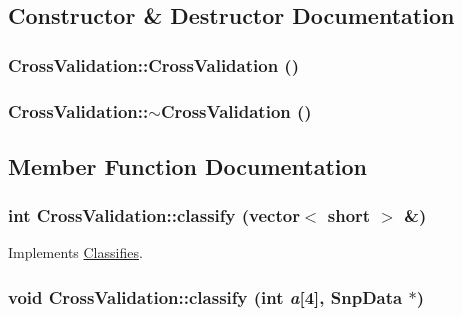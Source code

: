 \subsection{Constructor \& Destructor Documentation}
\hypertarget{classCrossValidation_a855f538ef5541634f1dd94fbf965129b}{
\subsubsection[{CrossValidation}]{\setlength{\rightskip}{0pt plus 5cm}CrossValidation::CrossValidation ()}}
\label{classCrossValidation_a855f538ef5541634f1dd94fbf965129b}
\hypertarget{classCrossValidation_a1e65ae700add864f2f85dcdf82940d74}{
\subsubsection[{$\sim$CrossValidation}]{\setlength{\rightskip}{0pt plus 5cm}CrossValidation::$\sim$CrossValidation ()}}
\label{classCrossValidation_a1e65ae700add864f2f85dcdf82940d74}


\subsection{Member Function Documentation}
\hypertarget{classCrossValidation_a4c11570314fe9e98e434abee990ac2d4}{
\subsubsection[{classify}]{\setlength{\rightskip}{0pt plus 5cm}int CrossValidation::classify (vector$<$ short $>$ \&)}}
\label{classCrossValidation_a4c11570314fe9e98e434abee990ac2d4}


Implements \hyperlink{classClassifies_a5e3d218b44024ec2c3ab3398e3dbd2e3}{Classifies}.

\hypertarget{classCrossValidation_a237cd67d2e1e6fc7c62abf0fef8bd3e8}{
\subsubsection[{classify}]{\setlength{\rightskip}{0pt plus 5cm}void CrossValidation::classify (int {\em a}\mbox{[}4\mbox{]}, \/  {\bf SnpData} $\ast$)}}
\label{classCrossValidation_a237cd67d2e1e6fc7c62abf0fef8bd3e8}


